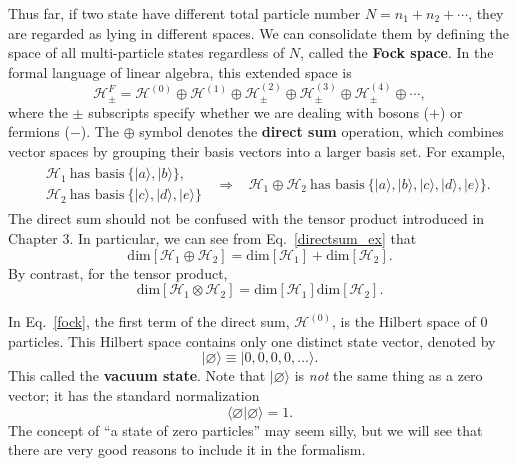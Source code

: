 \documentclass[prx,12pt]{revtex4-2}
\begin{document}
Thus far, if two state have different total particle number $N = n_1 +
n_2 + \cdots$, they are regarded as lying in different spaces.  We can
consolidate them by defining the space of all multi-particle states
regardless of $N$, called the \textbf{Fock space}.  In the formal
language of linear algebra, this extended space is
\begin{equation}
  \mathscr{H}_\pm^F = \mathscr{H}^{(0)} \oplus \mathscr{H}^{(1)} \oplus \mathscr{H}^{(2)}_\pm \oplus \mathscr{H}^{(3)}_\pm \oplus \mathscr{H}^{(4)}_\pm \oplus \cdots,
  \label{fock}
\end{equation}
where the $\pm$ subscripts specify whether we are dealing with bosons
($+$) or fermions ($-$).  The $\oplus$ symbol denotes the
\textbf{direct sum} operation, which combines vector spaces by
grouping their basis vectors into a larger basis set.  For example,
\begin{align}
  \begin{aligned}
    &\mathscr{H}_1~\textrm{has basis}~\big\{ |a\rangle, |b\rangle \big\}, \\
    &\mathscr{H}_2~\textrm{has basis}~\big\{ |c\rangle, |d\rangle, |e\rangle \big\}
  \end{aligned}
  \;\;\Rightarrow\;\;\;
\mathscr{H}_1 \oplus \mathscr{H}_2~\textrm{has basis}~\big\{ |a\rangle, |b\rangle, |c\rangle, |d\rangle, |e\rangle \big\}.
\label{directsum_ex}
\end{align}
The direct sum should not be confused with the tensor product
introduced in Chapter 3.  In particular, we can see from
Eq.~\eqref{directsum_ex} that
\begin{equation}
  \mathrm{dim}\left[\mathscr{H}_1 \oplus \mathscr{H}_2\right]
  = \mathrm{dim}\left[\mathscr{H}_1\right] +
  \mathrm{dim}\left[\mathscr{H}_2\right].
\end{equation}
By contrast, for the tensor product,
\begin{equation}
  \mathrm{dim}\left[\mathscr{H}_1 \otimes \mathscr{H}_2\right]
  = \mathrm{dim}\left[\mathscr{H}_1\right] 
  \mathrm{dim}\left[\mathscr{H}_2\right].
\end{equation}

In Eq.~\eqref{fock}, the first term of the direct sum,
$\mathscr{H}^{(0)}$, is the Hilbert space of 0 particles.  This
Hilbert space contains only one distinct state vector, denoted by
\begin{equation}
  |\varnothing\rangle \equiv |0,0,0,0,\dots\rangle.
\end{equation}
This called the \textbf{vacuum state}.  Note that
$|\varnothing\rangle$ is \textit{not} the same thing as a zero vector;
it has the standard normalization
\begin{equation}
  \langle\varnothing|\varnothing\rangle = 1.
\end{equation}
The concept of ``a state of zero particles'' may seem silly, but we
will see that there are very good reasons to include it in the
formalism.
\end{document}
